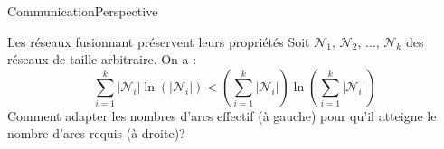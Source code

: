 \begin{frame}{Communication}{Perspective}

  \begin{block}{Les réseaux fusionnant préservent leurs propriétés}
    Soit $\mathcal{N}_1,\, \mathcal{N}_2,\, \ldots ,\, \mathcal{N}_k$ des réseaux
    de taille arbitraire. On a : \vspace{-5pt}
    \begin{equation}
      \sum\limits_{i = 1}^k |\mathcal{N}_i|\ln (|\mathcal{N}_i|) < (\sum\limits_{i = 1}^k |\mathcal{N}_i|)\ln{(\sum\limits_{i=1}^k |\mathcal{N}_i|)}
    \end{equation}
    Comment adapter les nombres d'arcs effectif (à gauche) pour qu'il atteigne le
    nombre d'arcs requis (à droite)?
  \end{block}


\end{frame}
